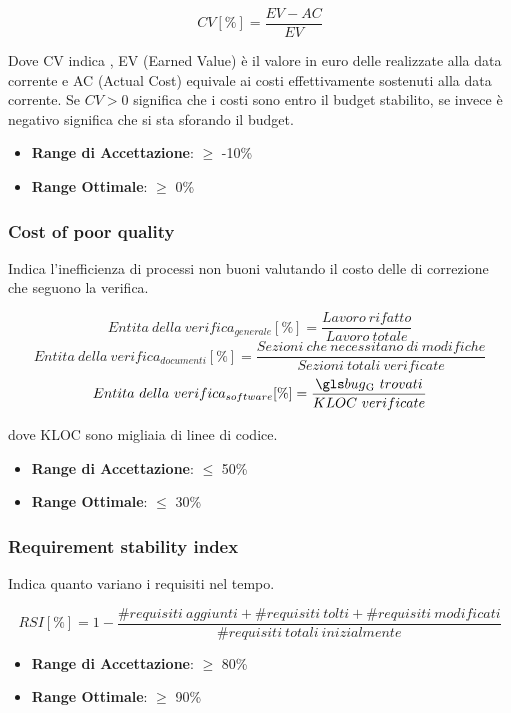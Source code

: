 \documentclass[12pt,a4paper]{article}
\begin{document}
\[CV [\%] = \frac{EV - AC}{EV}\]

Dove CV indica , EV (Earned Value) è il valore in euro delle  realizzate alla data corrente e AC (Actual Cost) equivale ai costi effettivamente sostenuti alla data corrente. Se $CV > 0$ significa che i costi sono entro il budget stabilito, se invece è negativo significa che si sta sforando il budget.

\begin{itemize}
\item \textbf{Range di Accettazione}: $\geq$ -10\%
\item \textbf{Range Ottimale}: $\geq$ 0\%
\end{itemize}

\subsubsection{Cost of poor quality}
Indica l'inefficienza di processi non buoni valutando il costo delle  di correzione che seguono la verifica.

\[Entita\ della\ verifica_{generale}[\%]= \frac{Lavoro\ rifatto}{Lavoro\ totale}\]
\[Entita\ della\ verifica_{documenti}[\%]= \frac{Sezioni\ che\ necessitano\ di\ modifiche}{Sezioni\ totali\ verificate}\]
\[Entita\ della\ verifica_{software}[\%]= \frac{\mgls{bug}\ trovati}{KLOC\ verificate}\]
	
dove KLOC sono migliaia di linee di codice.

\begin{itemize}
	\item \textbf{Range di Accettazione}: $\leq$ 50\%
	\item \textbf{Range Ottimale}: $\leq$ 30\%
\end{itemize}

\subsubsection{Requirement stability index}
Indica quanto variano i requisiti nel tempo.

\[RSI[\%]= 1 - \frac{\#requisiti\ aggiunti+\#requisiti\ tolti+\#requisiti\ modificati}{\#requisiti\ totali\ inizialmente}\]

\begin{itemize}
	\item \textbf{Range di Accettazione}: $\geq$ 80\%
	\item \textbf{Range Ottimale}: $\geq$ 90\%
\end{itemize}
\end{document}
